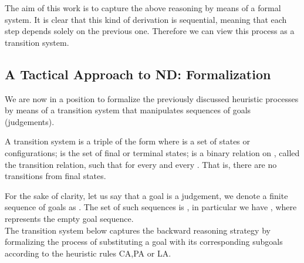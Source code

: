 \documentclass[a4paper,UKenglish]{lipics}
\begin{document}
\noindent The aim of this work is to capture the above reasoning by means of a formal system. It is clear that this kind of derivation is sequential, meaning that each step depends solely on the previous one. Therefore we can view this process as a transition system. 




\subsection{A Tactical Approach to ND: Formalization}

We are now in a position to formalize the previously discussed heuristic processes by means of a transition system that manipulates sequences of goals (judgements).

\begin{definition}
  A  transition system is a triple of the form  where  is a set of states or configurations;  is the set of final or terminal states;  is a binary relation on , called the transition relation, such that for every  and every . That is, there are no transitions from final states. 
\end{definition}


For the sake of clarity, let us say that a goal  is a judgement, we denote a finite sequence of goals as . The set of such sequences is , in particular we have , where  represents the empty goal sequence. \\

The transition system below captures the backward reasoning strategy by formalizing the process of substituting a goal with its corresponding subgoals according to the heuristic rules CA,PA or LA.
\end{document}
